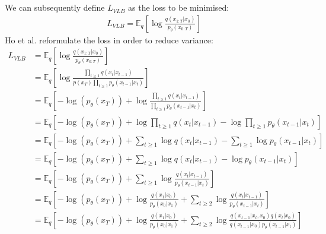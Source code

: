\documentclass{article}
\begin{document}
\\\\
We can subsequently define $L_{VLB}$ as the loss to be minimised:
\begin{gather}
  L_{VLB} = \mathbb{E}_q \left[\log \frac{q\left(x_{1:T}|x_0\right)}{p_{\theta}\left(x_{0:T}\right)}\right] 
\end{gather}
Ho et al. \cite{ho2020denoising} reformulate the loss in order to reduce variance:
\begin{align}
  L_{VLB} &= \mathbb{E}_q \left[\log \frac{q\left(x_{1:T}|x_0\right)}{p_{\theta}\left(x_{0:T}\right)}\right] \\
  &= \mathbb{E}_q \left[\log \frac{\prod_{t \geq 1} q\left(x_t | x_{t-1}\right)}{p\left(x_T\right) \prod_{t \geq 1} p_{\theta}\left(x_{t-1} | x_t\right)}\right] \\
  &= \mathbb{E}_q \left[-\log\left(p_{\theta}\left(x_T\right)\right) + \log \frac{\prod_{t \geq 1} q\left(x_t | x_{t-1}\right)}{\prod_{t \geq 1} p_{\theta}\left(x_{t-1} | x_t\right)}\right] \\
  &= \mathbb{E}_q \left[-\log\left(p_{\theta}\left(x_T\right)\right) + \log \prod_{t \geq 1} q\left(x_t | x_{t-1}\right) - \log \prod_{t \geq 1} p_{\theta}\left(x_{t-1} | x_t\right)\right] \\
  &= \mathbb{E}_q \left[-\log\left(p_{\theta}\left(x_T\right)\right) + \sum_{t \geq 1} \log q\left(x_t | x_{t-1}\right) - \sum_{t \geq 1} \log p_{\theta}\left(x_{t-1} | x_t\right)\right] \\
  &= \mathbb{E}_q \left[-\log\left(p_{\theta}\left(x_T\right)\right) + \sum_{t \geq 1} \log q\left(x_t | x_{t-1}\right) - \log p_{\theta}\left(x_{t-1} | x_t\right)\right] \\
  &= \mathbb{E}_q \left[-\log\left(p_{\theta}\left(x_T\right)\right) + \sum_{t \geq 1} \log \frac{q\left(x_t | x_{t-1}\right)}{p_{\theta}\left(x_{t-1} | x_t\right)}\right] \\
  &= \mathbb{E}_q \left[-\log\left(p_{\theta}\left(x_T\right)\right) + \log \frac{q\left(x_1 | x_0\right)}{p_{\theta}\left(x_0 | x_1\right)} + \sum_{t \geq 2} \log \frac{q\left(x_t | x_{t-1}\right)}{p_{\theta}\left(x_{t-1} | x_t\right)}\right] \\
  &= \mathbb{E}_q \left[-\log\left(p_{\theta}\left(x_T\right)\right) + \log \frac{q\left(x_1 | x_0\right)}{p_{\theta}\left(x_0 | x_1\right)} + \sum_{t \geq 2} \log \frac{q\left(x_{t-1} | x_t, x_0\right) q\left(x_t | x_0\right)}{{q\left(x_{t-1} | x_0\right)} p_{\theta}\left(x_{t-1} | x_t\right)}\right] \\

\end{align}
\end{document}
